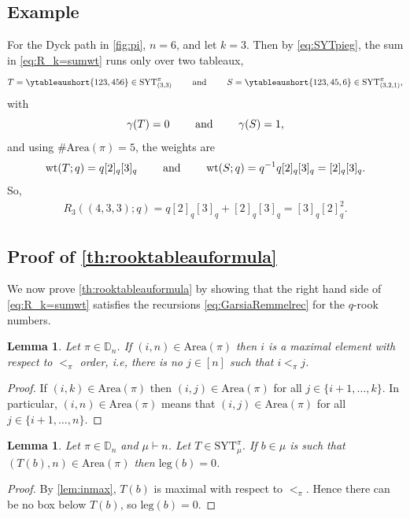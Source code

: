 \documentclass[12pt,reqno]{amsart}
\theoremstyle{plain}
\newtheorem{lemma}[theorem]{Lemma}
\theoremstyle{definition}
\theoremstyle{remark}
\theoremstyle{example}
\numberwithin{equation}{section}
\newcommand\leg{\mathrm{leg}}
\newcommand{\SYT}{\mathrm{SYT}}
\newcommand{\wt}{\mathrm{wt}}
\newcommand{\Area}{\mathrm{Area}}
\newcommand{\DD}{\mathbb{D}}
\begin{document}
\subsection{Example} For the Dyck path in \autoref{fig:pi}, $n = 6$, and let $k = 3$. Then by \eqref{eq:SYTpieg}, the sum in \eqref{eq:R_k=sumwt} runs only over two tableaux, $$ T = \ytableaushort{123,456} \in \SYT^\pi_{(3,3)} \qquad\hbox{ and }\qquad S = \ytableaushort{123,45,6} \in \SYT^\pi_{(3,2,1)},$$ with $$ \gamma(T) = 0 \qquad\hbox{ and }\qquad \gamma(S) = 1,$$ and using $\#\Area(\pi) = 5$, the weights are \begin{align*}
	\wt(T;q) = q[2]_q[3]_q \qquad\hbox{ and }\qquad \wt(S;q) =  q^{-1} q [2]_q[3]_q = [2]_q[3]_q.
\end{align*} So, \begin{align*}
R_{3}((4,3,3);q) = q[2]_q[3]_q + [2]_q[3]_q = [3]_q[2]_q^2.
\end{align*}

\subsection{Proof of \autoref{th:rooktableauformula}}

We now prove \autoref{th:rooktableauformula} by showing that the right hand side of \eqref{eq:R_k=sumwt} satisfies the recursions \eqref{eq:GarsiaRemmelrec} for the $q$-rook numbers. 

\begin{lemma}\label{lem:inmax}
	Let $\pi \in \DD_n$. If $(i,n) \in \Area(\pi)$ then $i$ is a maximal element with respect to $<_\pi$ order, i.e, there is no $j \in [n]$ such that $i <_\pi j$.
\end{lemma}
\begin{proof}
	If $(i,k) \in \Area(\pi)$ then $(i,j) \in \Area(\pi)$ for all $j \in \{i+1,\ldots,k\}$. In particular, $(i,n) \in \Area(\pi)$ means that $(i,j) \in \Area(\pi)$ for all $j \in \{i+1,\ldots,n\}$.
\end{proof} 

\begin{lemma}\label{lem:leg0lem}
	Let $\pi \in \DD_n$ and $\mu \vdash n$. Let $T \in \SYT^\pi_\mu$. If $b \in \mu$ is such that $(T(b),n) \in \Area(\pi)$ then $\leg(b) = 0$.
\end{lemma}
\begin{proof}
	By \autoref{lem:inmax}, $T(b)$ is maximal with respect to $<_\pi$. Hence there can be no box below $T(b)$, so $\leg(b) = 0$. 
\end{proof}
\end{document}
